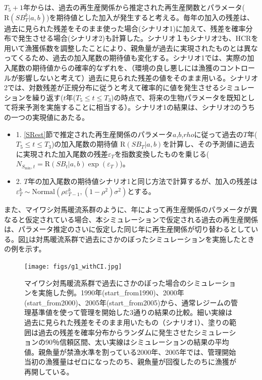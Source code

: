\documentclass[11pt]{jsarticle}
\begin{document}
$T_5+1$年からは、過去の再生産関係から推定された再生産関数とパラメータ($\mathrm{R}(S\!B_{T}^k|a,b)$)を期待値とした加入が発生すると考える。毎年の加入の残差は、過去に見られた残差をそのまま使った場合(シナリオ1)に加えて、残差を確率分布で発生させる場合(シナリオ2)も計算した。シナリオ１もシナリオ2も、HCRを用いて漁獲係数を調整したことにより、親魚量が過去に実現されたものとは異なってくるため、過去の加入尾数の期待値も変化する。シナリオ1では、実際の加入尾数の期待値からの確率的なずれを、（環境の良し悪しには漁獲のコントロールが影響しないと考えて）過去に見られた残差の値をそのまま用いる。シナリオ2では、対数残差が正規分布に従うと考えて確率的に値を発生させるシミュレーションを繰り返す($t$年($T_5 \leq t \leq T_3$)の時点で、将来の生物パラメータを既知として将来予測を実施することに相当する）。シナリオ1の結果は、シナリオ2のうちの一つの実現値にあたる。

\begin{itemize}
\item 1. \ref{SRest}節で推定された再生産関係のパラメータ$a$,$b$,$rho$に従って過去の$T$年($T_5 \leq t \leq T_3$)の加入尾数の期待値 $\mathrm{R}(S\!B_{T}|a,b)$を計算し、その予測値に過去に実現された加入尾数の残差$\varepsilon_{T}$を指数変換したものを乗じる($ N_{S_{\mathrm{min}},t} = \mathrm{R}(S\!B_{t}|a,b) \exp (\varepsilon_T)$)。
\item 2. $T$年の加入尾数の期待値シナリオ1と同じ方法で計算するが、加入の残差は$\varepsilon_{T}^k \sim \mathrm{Normal} (\rho \varepsilon_{T-1}^k,(1-\rho^2) \sigma^2)$とする。
\end{itemize}

また、マイワシ対馬暖流系群のように、年によって再生産関係のパラメータが異なると仮定されている場合、本シミュレーションで仮定される過去の再生産関係は、パラメータ推定のさいに仮定した同じ年に再生産関係が切り替わるとしている。図\ref{fig_whatif}は対馬暖流系群で過去にさかのぼったシミュレーションを実施したときの例を示す。

 \begin{figure}[b]
   \texttt{[image: figs/g1\_withCI.jpg]}
   \caption{
     マイワシ対馬暖流系群で過去にさかのぼった場合のシミュレーションを実施した例。1990年(start\_from1990)、2000年(start\_from2000)、2005年(start\_from2005)から、通常レジームの管理基準値を使って管理を開始した3通りの結果の比較。細い実線は過去に見られた残差をそのまま用いたもの（シナリオ1）、塗りの範囲は過去の残差を確率分布からランダムに発生させたシミュレーションの90％信頼区間、太い実線はシミュレーションの結果の平均値。親魚量が禁漁水準を割っている2000年、2005年では、管理開始当初の漁獲量はゼロになったのち、親魚量が回復したのちに漁獲が再開している。
   }
   \label{fig_whatif}
 \end{figure}
\end{document}
